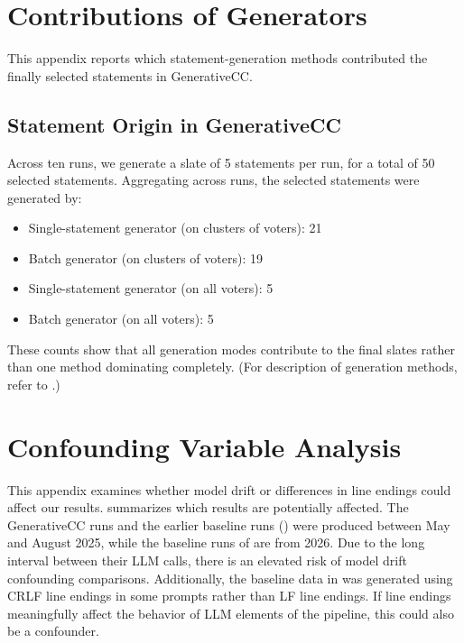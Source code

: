 \documentclass[letterpaper]{article} %
\begin{document}
\section{Contributions of Generators}
\label{app:statement-origin}

This appendix reports which statement-generation methods contributed the finally selected statements in GenerativeCC.

\subsection{Statement Origin in GenerativeCC}

Across ten runs, we generate a slate of 5 statements per run, for a total of 50 selected statements.
Aggregating across runs, the selected statements were generated by:
\begin{itemize}
    \item %
Single-statement generator (on clusters of voters): 21
    \item Batch generator (on clusters of voters): 19
    \item Single-statement generator (on all voters): 5
    \item Batch generator (on all voters): 5
\end{itemize}

These counts show that all generation modes contribute to the final slates rather than one method dominating completely.
(For description of generation methods, refer to .)


\section{Confounding Variable Analysis}
\label{app:model-drift}

This appendix examines whether model drift or differences in line endings could affect our results.
 summarizes which results are potentially affected.
The GenerativeCC runs and the earlier baseline runs () were produced between May and August 2025, while
the baseline runs of  are from 2026.
Due to the long interval between their LLM calls, there is an elevated risk of model drift confounding comparisons.
Additionally, the baseline data in  was generated using CRLF line endings in some prompts rather than LF line endings.
If line endings meaningfully affect the behavior of LLM elements of the pipeline, this could also be a confounder.
\end{document}
